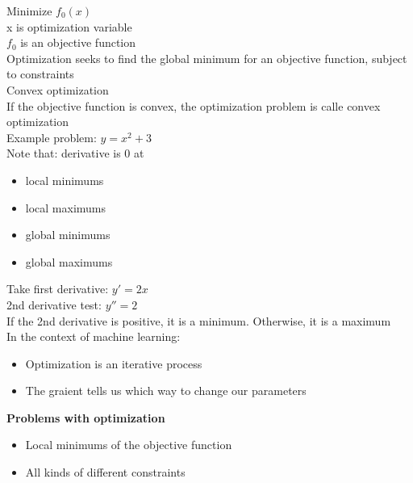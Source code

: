 \documentclass{article}
\begin{document}
Minimize $f_0(x)$\\
x is optimization variable\\
$f_0$ is an objective function\\
Optimization seeks to find the global minimum for an objective function, subject to constraints\\
Convex optimization\\
If the objective function is convex, the optimization problem is calle convex optimization\\
Example problem:
$y=x^2 + 3$\\
Note that: derivative is 0 at
\begin{itemize}
    \item local minimums
    \item local maximums
    \item global minimums
    \item global maximums
\end{itemize}
Take first derivative: $y'=2x$\\
2nd derivative test: $y''=2$\\
If the 2nd derivative is positive, it is a minimum. Otherwise, it is a maximum\\
In the context of machine learning:\\
\begin{itemize}
    \item Optimization is an iterative process
    \item The graient tells us which way to change our parameters
\end{itemize}
\textbf{Problems with optimization}
\begin{itemize}
    \item Local minimums of the objective function
    \item All kinds of different constraints
\end{itemize}
\end{document}
